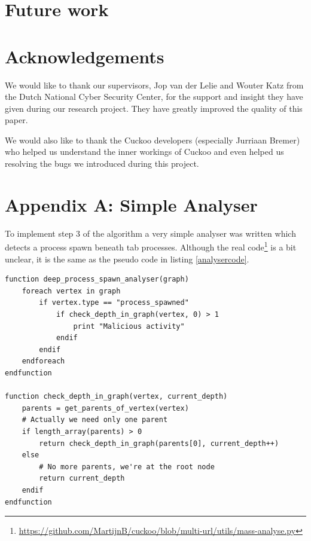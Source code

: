\documentclass{scrartcl}
\begin{document}
\clearpage

\section{Future work}


\clearpage

\section*{Acknowledgements}

We would like to thank our supervisors, Jop van der Lelie and Wouter Katz from the Dutch National Cyber Security Center, for the support and insight they have given during our research project. They have greatly improved the quality of this paper.

We would also like to thank the Cuckoo developers (especially Jurriaan Bremer) who helped us understand the inner workings of Cuckoo and even helped us resolving the bugs we introduced during this project.

\clearpage




\clearpage

\section*{Appendix A: Simple Analyser}

To implement step 3 of the algorithm a very simple analyser was written which detects a process spawn beneath tab processes. Although the real code\footnote{\url{https://github.com/MartijnB/cuckoo/blob/multi-url/utils/mass-analyse.py}} is a bit unclear, it is the same as the pseudo code in listing \ref{analysercode}.

\begin{lstlisting}[caption={Pseudo code for phase 3 of the algorithm},label={analysercode}]
function deep_process_spawn_analyser(graph)
    foreach vertex in graph
        if vertex.type == "process_spawned"
            if check_depth_in_graph(vertex, 0) > 1
                print "Malicious activity"
            endif
        endif
    endforeach
endfunction

function check_depth_in_graph(vertex, current_depth)
    parents = get_parents_of_vertex(vertex)
    # Actually we need only one parent
    if length_array(parents) > 0
        return check_depth_in_graph(parents[0], current_depth++)
    else
        # No more parents, we're at the root node
        return current_depth
    endif
endfunction
\end{lstlisting}
\end{document}
